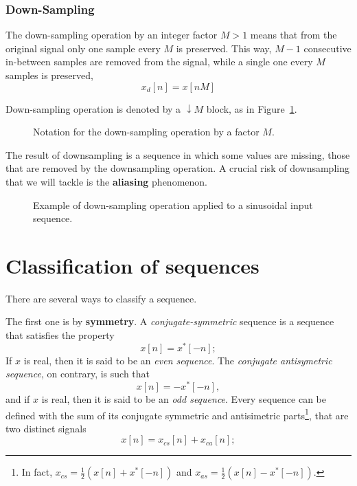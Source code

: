\documentclass[\documentfontsize, twocolumn]{\classname}
\begin{document}
\subsubsection{Down-Sampling}

The down-sampling operation by an integer factor $M > 1$ means that from the
original signal only one sample every $M$ is preserved. This way, $M-1$ consecutive
in-between samples are removed from the signal, while a single one every $M$ samples is preserved,
\begin{equation}\label{eqn:DownSampling}
	x_d[n] = x[nM]
\end{equation}

Down-sampling operation is denoted by a $\downarrow M$ block, as in Figure~\ref{tikz:downsamplingOperation}.
\begin{figure}[ht]
\begin{center}
    \caption{Notation for the down-sampling operation by a factor $M$.}\label{tikz:downsamplingOperation}
\end{center}
\end{figure}
The result of downsampling is a se\-quen\-ce in which some values are missing, those that are removed by the downsampling operation. A crucial risk of downsampling that we will tackle is the \textbf{aliasing} phenomenon.
\begin{figure*}[ht]
    \centering
    \scalebox{0.6}{
    
    }\caption{Example of down-sampling operation applied to a sinusoidal input se\-quen\-ce.}\label{oct:downsamplingOperationEffect}
\end{figure*}


\section{Classification of se\-quen\-ces}

There are several ways to classify a se\-quen\-ce.

The first one is by \textbf{symmetry}. A \emph{conjugate-symmetric} se\-quen\-ce is a se\-quen\-ce that satisfies the property \[x[n] = x^*[-n];\] If $x$ is real, then it is said to be an \emph{even se\-quen\-ce}. The \emph{conjugate antisymetric se\-quen\-ce}, on contrary, is such that \[x[n] = -x^*[-n],\] and if $x$ is real, then it is said to be an \emph{odd se\-quen\-ce}. Every se\-quen\-ce can be defined with the sum of its conjugate symmetric and antisimetric parts\footnote{In fact, $x_{cs} = \frac{1}{2}(x[n] + x^*[-n])$ and $x_{as} = \frac{1}{2}(x[n] - x^*[-n])$.}, that are two distinct signals \[x[n] = x_{cs}[n] + x_{ca}[n];\]
\end{document}
